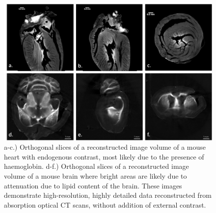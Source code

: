	\begin{figure}[H]
		\centering
		\includegraphics[width = \textwidth]{meth_img/heart_brain_sclbr.png}
		\caption{a-c.) Orthogonal slices of a reconstructed image volume of a mouse heart with endogenous contrast, most likely due to the presence of haemoglobin. d-f.) Orthogonal slices of a reconstructed image volume of a mouse brain where bright areas are likely due to attenuation due to lipid content of the brain. These images demonstrate high-resolution, highly detailed data reconstructed from absorption optical CT scans,  without addition of external contrast.}
		\label{fig:heart_brain}
	\end{figure}
	










